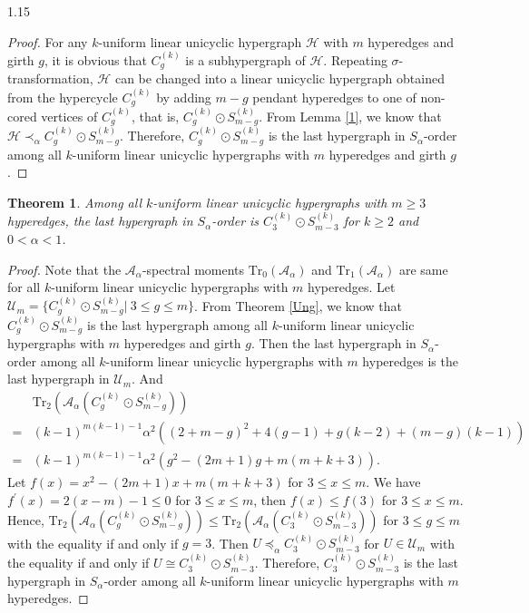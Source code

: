 \documentclass[preprint,12pt]{elsarticle1}
\newtheorem{thm}{Theorem}[section]
\numberwithin{equation}{section}
\begin{document}
\begin{spacing}{1.15}
\begin{proof}
For any $k$-uniform linear unicyclic hypergraph $\mathcal{H}$ with $m$ hyperedges and girth $g$, it is obvious that $C_g^{(k)}$ is a subhypergraph of $\mathcal{H}$.
Repeating $\sigma$-transformation, $\mathcal{H}$ can be changed into a linear unicyclic hypergraph obtained from the hypercycle $C_g^{(k)}$ by adding $m-g$ pendant hyperedges to one of non-cored vertices of $C_g^{(k)}$, that is, $C_{g}^{(k)}\odot S_{m-g}^{(k)}$. From Lemma \ref{1},
we know that $\mathcal{H}\prec_{\alpha}C_{g}^{(k)}\odot S_{m-g}^{(k)}$.
Therefore, $C_{g}^{(k)}\odot S_{m-g}^{(k)}$ is the last hypergraph in $S_{\alpha}$-order among all $k$-uniform linear unicyclic hypergraphs with $m$ hyperedges and girth $g$.
\end{proof}

\begin{thm}\label{un3}
Among all $k$-uniform linear unicyclic hypergraphs with $m\ge3$ hyperedges, the last hypergraph in $S_{\alpha}$-order is $C_{3}^{(k)}\odot S_{m-3}^{(k)}$ for $k\ge2$ and $0<\alpha<1$.
\end{thm}

\begin{proof}
Note that the $\mathcal{A}_{\alpha}$-spectral moments $\mathrm{Tr}_0(\mathcal{A}_{\alpha})$ and $\mathrm{Tr}_1(\mathcal{A}_{\alpha})$ are same for all $k$-uniform linear unicyclic hypergraphs with $m$ hyperedges.
Let $\mathcal{U}_{m}=\{C_{g}^{(k)}\odot S_{m-g}^{(k)}|~ 3\le g\le m\}$.
From Theorem \ref{Ung}, we know that $C_{g}^{(k)}\odot S_{m-g}^{(k)}$ is the last hypergraph among all $k$-uniform linear unicyclic hypergraphs with $m$ hyperedges and girth $g$.
Then the last hypergraph in $S_{\alpha}$-order among all $k$-uniform linear unicyclic hypergraphs with $m$ hyperedges is the last hypergraph in $\mathcal{U}_{m}$. And
\begin{align*}
&\mathrm{Tr}_{2}(\mathcal{A}_{\alpha}(C_{g}^{(k)}\odot S_{m-g}^{(k)}))\\
=&(k-1)^{m(k-1)-1} \alpha^2 \left( (2+m-g)^2+4(g-1)+g(k-2)+(m-g)(k-1) \right)\\
=&(k-1)^{m(k-1)-1} \alpha^2 \left( g^2-(2m+1)g+m(m+k+3) \right).
\end{align*}
Let $f(x)=x^2-(2m+1)x+m(m+k+3)$ for $3\le x\le m$. We have $f^{'}(x)=2(x-m)-1\le0$ for $3\le x\le m$, then $f(x)\le f(3)$ for $3\le x\le m$.
Hence, $\mathrm{Tr}_{2}(\mathcal{A}_{\alpha}(C_{g}^{(k)}\odot S_{m-g}^{(k)}))\le \mathrm{Tr}_{2}(\mathcal{A}_{\alpha}(C_{3}^{(k)}\odot S_{m-3}^{(k)}))$ for $3\le g\le m$ with the equality if and only if $g=3$.
Then $U\preceq_{\alpha}C_{3}^{(k)}\odot S_{m-3}^{(k)}$ for $U\in\mathcal{U}_{m}$ with the equality if and only if $U\cong C_{3}^{(k)}\odot S_{m-3}^{(k)}$.
Therefore, $C_{3}^{(k)}\odot S_{m-3}^{(k)}$ is the last hypergraph in $S_{\alpha}$-order among all $k$-uniform linear unicyclic hypergraphs with $m$ hyperedges.
\end{proof}


\end{spacing}
\end{document}
